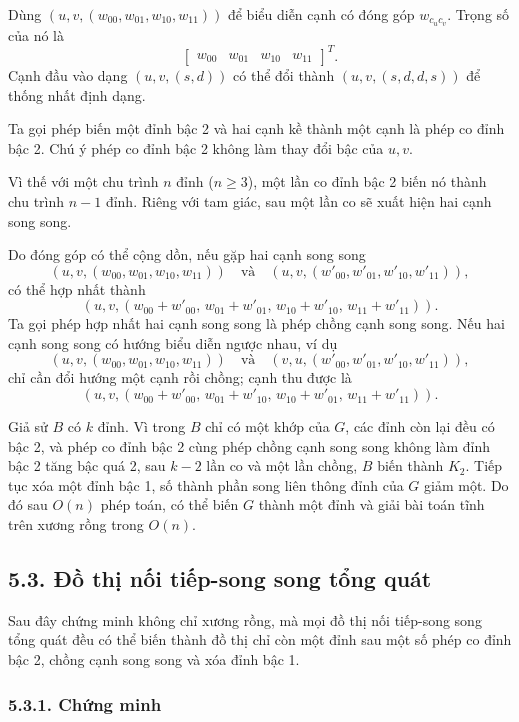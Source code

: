 \documentclass[11pt]{article}
\begin{document}
Dùng \((u,v,(w_{00},w_{01},w_{10},w_{11}))\) để biểu diễn cạnh có đóng góp
\(w_{c_uc_v}\). Trọng số của nó là
\[
  \begin{bmatrix}w_{00}&w_{01}&w_{10}&w_{11}\end{bmatrix}^{T}.
\]
Cạnh đầu vào dạng \((u,v,(s,d))\) có thể đổi thành
\((u,v,(s,d,d,s))\) để thống nhất định dạng.

Ta gọi phép biến một đỉnh bậc 2 và hai cạnh kề thành một cạnh là phép co đỉnh
bậc 2. Chú ý phép co đỉnh bậc 2 không làm thay đổi bậc của \(u,v\).

Vì thế với một chu trình \(n\) đỉnh (\(n\ge3\)), một lần co đỉnh bậc 2 biến nó
thành chu trình \(n-1\) đỉnh. Riêng với tam giác, sau một lần co sẽ xuất hiện
hai cạnh song song.

Do đóng góp có thể cộng dồn, nếu gặp hai cạnh song song
\[
  (u,v,(w_{00},w_{01},w_{10},w_{11}))
  \quad\text{và}\quad
  (u,v,(w'_{00},w'_{01},w'_{10},w'_{11})),
\]
có thể hợp nhất thành
\[
  (u,v,(w_{00}+w'_{00},\,w_{01}+w'_{01},\,
        w_{10}+w'_{10},\,w_{11}+w'_{11})).
\]
Ta gọi phép hợp nhất hai cạnh song song là phép chồng cạnh song song. Nếu hai
cạnh song song có hướng biểu diễn ngược nhau, ví dụ
\[
  (u,v,(w_{00},w_{01},w_{10},w_{11}))
  \quad\text{và}\quad
  (v,u,(w'_{00},w'_{01},w'_{10},w'_{11})),
\]
chỉ cần đổi hướng một cạnh rồi
chồng; cạnh thu được là
\[
 (u,v,(w_{00}+w'_{00},\,w_{01}+w'_{10},\,
       w_{10}+w'_{01},\,w_{11}+w'_{11})).
\]

Giả sử \(B\) có \(k\) đỉnh. Vì trong \(B\) chỉ có một khớp của \(G\), các
đỉnh còn lại đều có bậc 2, và phép co đỉnh bậc 2 cùng phép chồng cạnh song
song không làm đỉnh bậc 2 tăng bậc quá 2, sau \(k-2\) lần co và một lần chồng,
\(B\) biến thành \(K_2\). Tiếp tục xóa một đỉnh bậc 1, số thành phần song liên
thông đỉnh của \(G\) giảm một. Do đó sau \(O(n)\) phép toán, có thể biến
\(G\) thành một đỉnh và giải bài toán tĩnh trên xương rồng trong \(O(n)\).

\subsection*{5.3. Đồ thị nối tiếp-song song tổng quát}

Sau đây chứng minh không chỉ xương rồng, mà mọi đồ thị nối tiếp-song song tổng
quát đều có thể biến thành đồ thị chỉ còn một đỉnh sau một số phép co đỉnh
bậc 2, chồng cạnh song song và xóa đỉnh bậc 1.

\subsubsection*{5.3.1. Chứng minh}
\end{document}
